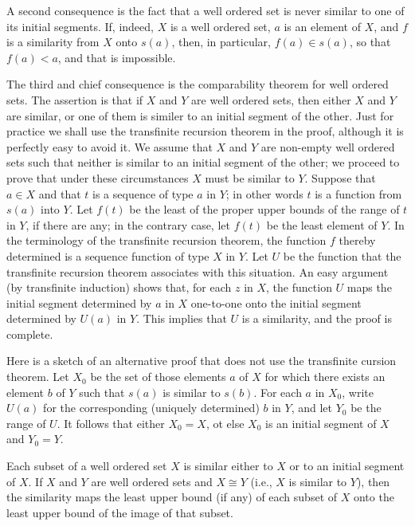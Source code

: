 A second consequence is the fact that a well ordered set is never similar to one of its initial segments. If, indeed, $X$ is a well ordered set, $a$ is an element of $X$, and $f$ is a similarity from $X$ onto $s(a)$, then, in particular, $f(a) \in s(a)$, so that $f(a) < a$, and that is impossible. 

The third and chief consequence is the comparability theorem for well ordered sets. The assertion is that if $X$ and $Y$ are well ordered sets, then either $X$ and $Y$ are similar, or one of them is similer to an initial segment of the other. Just for practice we shall use the transfinite recursion theorem in the proof, although it is perfectly easy to avoid it. We assume that $X$ and $Y$ are non-empty well ordered sets such that neither is similar to an initial segment of the other; we proceed to prove that under these circumstances $X$ must be similar to $Y$. Suppose that $a \in X$ and that $t$ is a sequence of type $a$ in $Y$; in other words $t$ is a function from $s(a)$ into $Y$. Let $f(t)$ be the least of the proper upper bounds of the range of $t$ in $Y$, if there are any; in the contrary case, let $f(t)$ be the least element of $Y$. In the terminology of the transfinite recursion theorem, the function $f$ thereby determined is a sequence function of type $X$ in $Y$. Let $U$ be the function that the transfinite recursion theorem associates with this situation. An easy argument (by transfinite induction) shows that, for each $z$ in $X$, the function $U$ maps the initial segment determined by $a$ in $X$ one-to-one onto the initial segment determined by $U(a)$ in $Y$. This implies that $U$ is a similarity, and the proof is complete. 

Here is a sketch of an alternative proof that does not use the transfinite cursion theorem. Let $X_{0}$ be the set of those elements $a$ of $X$ for which there exists an element $b$ of $Y$ such that $s(a)$ is similar to $s(b)$. For each $a$ in $X_{0}$, write $U(a)$ for the corresponding (uniquely determined) $b$ in $Y$, and let $Y_{0}$ be the range of $U$. It follows that either $X_{0} = X$, ot else $X_{0}$ is an initial segment of $X$ and $Y_{0} = Y$. 

\begin{exercise} Each subset of a well ordered set $X$ is similar either to $X$ or to an initial segment of $X$. If $X$ and $Y$ are well ordered sets and $X \cong Y$ (i.e., $X$ is similar to $Y$), then the similarity maps the least upper bound (if any) of each subset of $X$ onto the least upper bound of the image of that subset.
\end{exercise}
